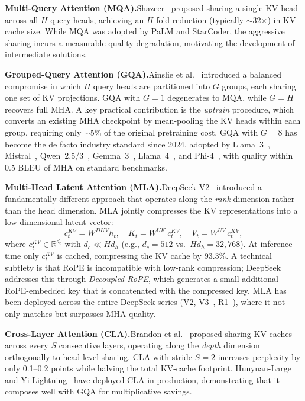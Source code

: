 \textbf{Multi-Query Attention (MQA).}\quad Shazeer~\cite{shazeer2019fast} proposed sharing a single KV head across all $H$ query heads, achieving an $H$-fold reduction (typically $\sim$32$\times$) in KV-cache size. While MQA was adopted by PaLM and StarCoder, the aggressive sharing incurs a measurable quality degradation, motivating the development of intermediate solutions.

\textbf{Grouped-Query Attention (GQA).}\quad Ainslie et al.~\cite{ainslie2023gqa} introduced a balanced compromise in which $H$ query heads are partitioned into $G$ groups, each sharing one set of KV projections. GQA with $G = 1$ degenerates to MQA, while $G = H$ recovers full MHA. A key practical contribution is the \emph{uptrain} procedure, which converts an existing MHA checkpoint by mean-pooling the KV heads within each group, requiring only $\sim$5\% of the original pretraining cost. GQA with $G = 8$ has become the de facto industry standard since 2024, adopted by Llama~3~\cite{grattafiori2024llama3}, Mistral~\cite{jiang2023mistral}, Qwen~2.5/3~\cite{yang2024qwen25,yang2025qwen3}, Gemma~3~\cite{gemma2025gemma3}, Llama~4~\cite{meta2025llama4}, and Phi-4~\cite{abdin2024phi4}, with quality within 0.5 BLEU of MHA on standard benchmarks.

\textbf{Multi-Head Latent Attention (MLA).}\quad DeepSeek-V2~\cite{deepseekv2_2024_mla} introduced a fundamentally different approach that operates along the \emph{rank} dimension rather than the head dimension. MLA jointly compresses the KV representations into a low-dimensional latent vector:
\begin{equation}
c_t^{KV} = W^{DKV} h_t, \quad K_t = W^{UK}\, c_t^{KV}, \quad V_t = W^{UV}\, c_t^{KV},
\end{equation}
where $c_t^{KV} \in \mathbb{R}^{d_c}$ with $d_c \ll Hd_h$ (e.g., $d_c = 512$ vs.\ $Hd_h = 32{,}768$). At inference time only $c_t^{KV}$ is cached, compressing the KV cache by 93.3\%. A technical subtlety is that RoPE is incompatible with low-rank compression; DeepSeek addresses this through \emph{Decoupled RoPE}, which generates a small additional RoPE-embedded key that is concatenated with the compressed key. MLA has been deployed across the entire DeepSeek series (V2, V3~\cite{liu2024deepseek}, R1~\cite{deepseek2025r1}), where it not only matches but surpasses MHA quality.

\textbf{Cross-Layer Attention (CLA).}\quad Brandon et al.~\cite{brandon2024reducing} proposed sharing KV caches across every $S$ consecutive layers, operating along the \emph{depth} dimension orthogonally to head-level sharing. CLA with stride $S = 2$ increases perplexity by only 0.1--0.2 points while halving the total KV-cache footprint. Hunyuan-Large~\cite{sun2024hunyuan} and Yi-Lightning~\cite{yi2024lightning} have deployed CLA in production, demonstrating that it composes well with GQA for multiplicative savings.


